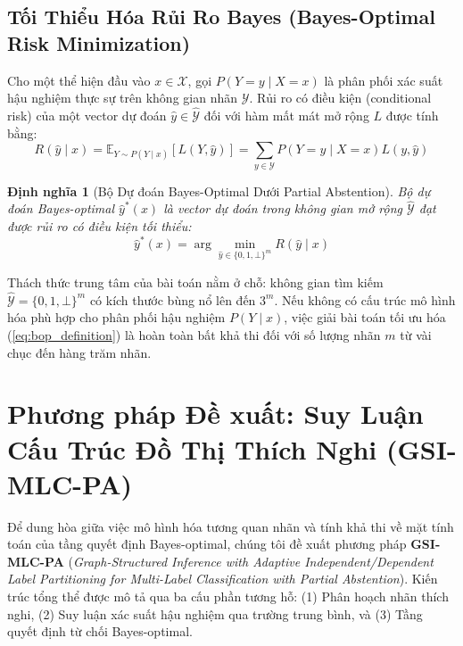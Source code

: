 \documentclass[11pt,a4paper]{article}
\newtheorem{definition}{Định nghĩa}[section]
\begin{document}
\subsection{Tối Thiểu Hóa Rủi Ro Bayes (Bayes-Optimal Risk Minimization)}
Cho một thể hiện đầu vào $x \in \mathcal{X}$, gọi $P(Y = y \mid X = x)$ là phân phối xác suất hậu nghiệm thực sự trên không gian nhãn $\mathcal{Y}$. Rủi ro có điều kiện (conditional risk) của một vector dự đoán $\hat{y} \in \hat{\mathcal{Y}}$ đối với hàm mất mát mở rộng $L$ được tính bằng:
\begin{equation}
R(\hat{y} \mid x) = \mathbb{E}_{Y \sim P(Y \mid x)}[L(Y, \hat{y})] = \sum_{y \in \mathcal{Y}} P(Y = y \mid X = x) L(y, \hat{y})
\label{eq:conditional_risk}
\end{equation}

\begin{definition}[Bộ Dự đoán Bayes-Optimal Dưới Partial Abstention]
Bộ dự đoán Bayes-optimal $\hat{y}^*(x)$ là vector dự đoán trong không gian mở rộng $\hat{\mathcal{Y}}$ đạt được rủi ro có điều kiện tối thiểu:
\begin{equation}
\hat{y}^*(x) = \arg\min_{\hat{y} \in \{0, 1, \bot\}^m} R(\hat{y} \mid x)
\label{eq:bop_definition}
\end{equation}
\end{definition}

Thách thức trung tâm của bài toán nằm ở chỗ: không gian tìm kiếm $\hat{\mathcal{Y}} = \{0, 1, \bot\}^m$ có kích thước bùng nổ lên đến $3^m$. Nếu không có cấu trúc mô hình hóa phù hợp cho phân phối hậu nghiệm $P(Y \mid x)$, việc giải bài toán tối ưu hóa (\ref{eq:bop_definition}) là hoàn toàn bất khả thi đối với số lượng nhãn $m$ từ vài chục đến hàng trăm nhãn.

\newpage
\section{Phương pháp Đề xuất: Suy Luận Cấu Trúc Đồ Thị Thích Nghi (GSI-MLC-PA)}
\label{sec:gsi_methodology}

Để dung hòa giữa việc mô hình hóa tương quan nhãn và tính khả thi về mặt tính toán của tầng quyết định Bayes-optimal, chúng tôi đề xuất phương pháp \textbf{GSI-MLC-PA} (\textit{Graph-Structured Inference with Adaptive Independent/Dependent Label Partitioning for Multi-Label Classification with Partial Abstention}). Kiến trúc tổng thể được mô tả qua ba cấu phần tương hỗ: (1) Phân hoạch nhãn thích nghi, (2) Suy luận xác suất hậu nghiệm qua trường trung bình, và (3) Tầng quyết định từ chối Bayes-optimal.
\end{document}
